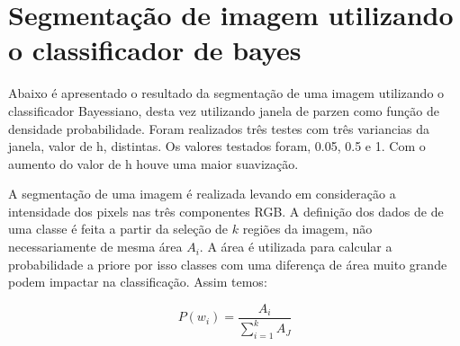 \documentclass[ 
	article,			%
	11pt,				%
	oneside,			%
	a4paper,			%
	english,			%
	brazil,				%
	]{abntex2}
\begin{document}
\section{Segmentação de imagem utilizando o classificador de bayes} 
Abaixo é apresentado o resultado da segmentação de uma imagem utilizando o
classificador Bayessiano, desta vez utilizando janela de parzen como função de
densidade probabilidade. Foram realizados três testes com três variancias da
janela, valor de h, distintas. Os valores testados foram, 0.05, 0.5 e 1. Com o
aumento do valor de h houve uma maior suavização.

A segmentação de uma imagem é realizada levando em
consideração a intensidade dos pixels nas três componentes RGB.
A definição dos dados de de uma classe é feita a partir da seleção de $k$
regiões da imagem, não necessariamente de mesma área $A_i$. A área é utilizada
para calcular a probabilidade a priore por isso classes com uma diferença de
área muito grande podem impactar na classificação.
Assim temos:

\begin{equation}
	P(w_i) =  \frac{A_i}{\sum_{i=1}^{k}{A_J}}
\end{equation}
\end{document}
